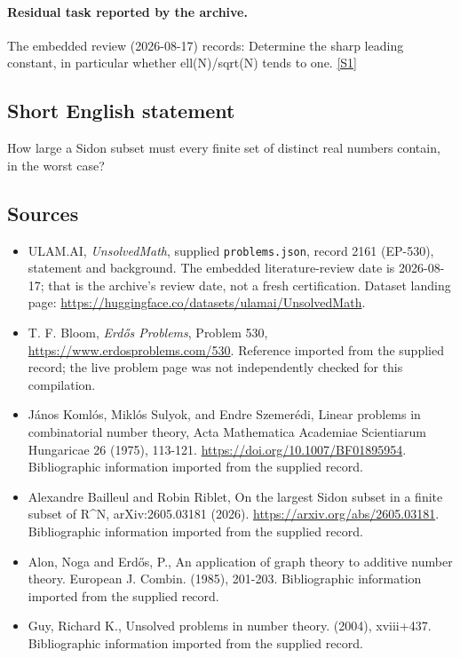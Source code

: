 \documentclass[11pt,a4paper]{article}
\newcommand{\sref}[2]{\hyperlink{source:#1:#2}{[S#2]}}
\begin{document}
\paragraph{Residual task reported by the archive.}

The embedded review (2026-08-17) records: Determine the sharp leading constant, in particular whether ell(N)/sqrt(N) tends to one. \sref{2161}{1}

\subsection{Short English statement}

How large a Sidon subset must every finite set of distinct real numbers contain, in the worst case?

\subsection{Sources}

{\small

\begin{itemize}

\item[\hypertarget{source:2161:1}{S1}] ULAM.AI, \emph{UnsolvedMath}, supplied \texttt{problems.json}, record 2161 (EP-530), statement and background. The embedded literature-review date is 2026-08-17; that is the archive’s review date, not a fresh certification. Dataset landing page: \url{https://huggingface.co/datasets/ulamai/UnsolvedMath}.

\item[\hypertarget{source:2161:2}{S2}] T. F. Bloom, \emph{Erdős Problems}, Problem 530, \url{https://www.erdosproblems.com/530}. Reference imported from the supplied record; the live problem page was not independently checked for this compilation.

\item[\hypertarget{source:2161:3}{S3}] János Komlós, Miklós Sulyok, and Endre Szemerédi, Linear problems in combinatorial number theory, Acta Mathematica Academiae Scientiarum Hungaricae 26 (1975), 113-121. \url{https://doi.org/10.1007/BF01895954}. Bibliographic information imported from the supplied record.

\item[\hypertarget{source:2161:4}{S4}] Alexandre Bailleul and Robin Riblet, On the largest Sidon subset in a finite subset of R\textasciicircum{}N, arXiv:2605.03181 (2026). \url{https://arxiv.org/abs/2605.03181}. Bibliographic information imported from the supplied record.

\item[\hypertarget{source:2161:5}{S5}] Alon, Noga and Erd\H{o}s, P., An application of graph theory to additive number theory. European J. Combin. (1985), 201-203. Bibliographic information imported from the supplied record.

\item[\hypertarget{source:2161:6}{S6}] Guy, Richard K., Unsolved problems in number theory. (2004), xviii+437. Bibliographic information imported from the supplied record.

\end{itemize}

}

\label{end:2161}
\end{document}
